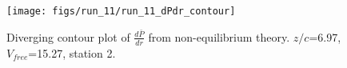 \begin{figure}[H]
\centering
\texttt{[image: figs/run\_11/run\_11\_dPdr\_contour]}
\caption{Diverging contour plot of $\frac{d\bar{P}}{dr}$ from non-equilibrium theory. $z/c$=6.97, $V_{free}$=15.27, station 2.}
\label{fig:run_11_dPdr_contour}
\end{figure}


